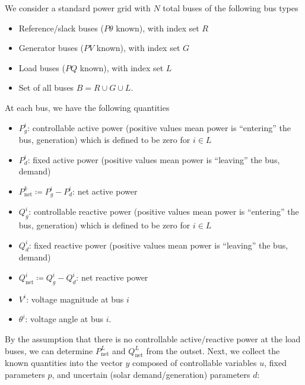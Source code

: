 We consider a standard power grid with $N$ total buses of the following bus types
\begin{itemize}
	\item Reference/slack buses ($P\theta$ known), with index set $R$	
	\item Generator buses ($PV$ known), with index set $G$
	\item Load buses ($PQ$ known), with index set $L$
	\item Set of all buses $B = R \cup G \cup L$.
\end{itemize}
At each bus, we have the following quantities
\begin{itemize}
	\item $P_g^i$: controllable active power (positive values mean power is ``entering'' the bus, \ie generation) which is defined to be zero for $i \in L$
	\item $P_d^i$: fixed active power (positive values mean power is ``leaving'' the bus, \ie demand)
	\item $P_{\text{net}}^k \coloneqq P_g^i - P_d^i$: net active power
	\item $Q_g^i$: controllable reactive power (positive values mean power is ``entering'' the bus, \ie generation) which is defined to be zero for $i \in L$
	\item $Q_d^i$: fixed reactive power (positive values mean power is ``leaving'' the bus, \ie demand)
	\item $Q_{\text{net}}^i \coloneqq Q_g^i - Q_d^i$: net reactive power
	\item $V^i$: voltage magnitude at bus $i$
	\item $\theta^i$: voltage angle at bus $i$.
\end{itemize}
By the assumption that there is no controllable active/reactive power at the load buses, we can determine $P_{\text{net}}^L$ and $Q_{\text{net}}^L$ from the outset.
Next, we collect the known quantities into the vector $y$ composed of controllable variables $u$, fixed parameters $p$, and uncertain (solar demand/generation) parameters $d$:
